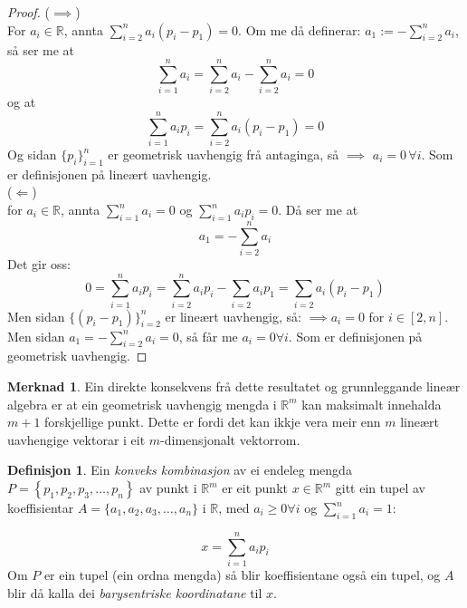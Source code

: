 \documentclass[a4paper, 12pt, norsk]{article}
\theoremstyle{plain}
\theoremstyle{definition}
\newtheorem{definition}[theorem]{Definisjon}
\newtheorem{remark}[theorem]{Merknad}
\newcommand{\Rb}{\mathbb{R}}
\newcommand{\set}[1]{ \left \{ #1 \right \} } %
\begin{document}
\begin{proof}
	($\implies$)
	\\For $a_i\in\Rb$, annta $\sum_{i=2}^na_i(p_i-p_1)=0$. Om me då definerar: $a_1 := -\sum_{i=2}^na_i$, så ser me at 
	\begin{equation*}
		\sum_{i=1}^na_i=\sum_{i=2}^na_i-\sum_{i=2}^na_i=0
	\end{equation*}
	og at 
	\begin{equation*}
		\sum_{i=1}^na_ip_i=\sum_{i=2}^na_i(p_i-p_1)=0
	\end{equation*}
	Og sidan $\{p_i\}_{i=1}^n$ er geometrisk uavhengig frå antaginga, så $\implies$ $a_i=0 \, \forall i$. Som er definisjonen på lineært uavhengig.
	\\(\(\Longleftarrow\))
	\\for $a_i\in\Rb$, annta $\sum_{i=1}^n a_i=0$ og $\sum_{i=1}^n a_ip_i=0$. Då ser me at 
	\begin{equation*}
		a_1=-\sum_{i=2}^n a_i
	\end{equation*} 
	Det gir oss: 
	\begin{equation*}
		0=\sum_{i=1}^n a_ip_i=\sum_{i=2}^n a_ip_i-\sum_{i=2}a_ip_1=\sum_{i=2}a_i(p_i-p_1)
	\end{equation*}
	Men sidan $\{(p_i-p_1)\}_{i=2}^n$ er lineært uavhengig, så: $\implies a_i = 0$ for $i\in[2,n]$. Men sidan $a_1 = -\sum_{i=2}^n a_i=0$, så får me $a_i=0 \forall i$. Som er definisjonen på geometrisk uavhengig.
\end{proof}

\begin{remark}
	Ein direkte konsekvens frå dette resultatet og grunnleggande lineær algebra er at ein geometrisk uavhengig mengda i $\Rb^m$ kan maksimalt innehalda $m+1$ forskjellige punkt. Dette er fordi det kan ikkje vera meir enn $m$ lineært uavhengige vektorar i eit $m$-dimensjonalt vektorrom.
\end{remark}

\begin{definition}
	Ein \emph{konveks kombinasjon} av ei endeleg mengda \( P = \set{p_1, p_2, p_3, \dots, p_n} \) av punkt i \( \Rb^m \) er eit punkt \( x\in\Rb^m \) gitt ein tupel av koeffisientar \( A=\{a_1, a_2, a_3, \dots, a_n\} \) i \( \Rb \), med \( a_i\geq0\forall i \) og \( \sum_{i=1}^n a_i = 1 : \)
	
	\begin{equation*}
		x=\sum_{i=1}^n a_ip_i
	\end{equation*}
	Om $P$ er ein tupel (ein ordna mengda) så blir koeffisientane også ein tupel, og $A$ blir då kalla dei \emph{barysentriske koordinatane} til $x$.
\end{definition}
\end{document}

